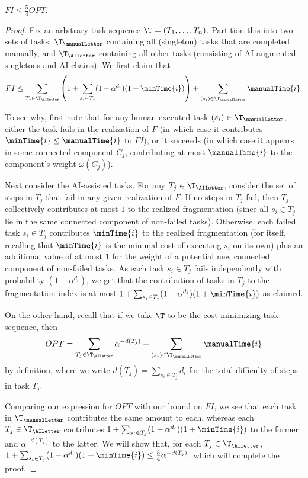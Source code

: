 \begin{lem}
\label{lem:FI.upper.bound}
    $FI \leq \tfrac{5}{4}OPT$.
\end{lem}
\begin{proof}
Fix an arbitrary task sequence $\T = (T_1, \dotsc, T_n)$.
Partition this into two sets of tasks: $\T_{\manualLetter}$ containing all (singleton) tasks that are completed manually, and $\T_{\AIletter}$ containing all other tasks (consisting of AI-augmented singletons and AI chains).
We first claim that
\[ FI \leq \sum_{T_j \in \T_{\AIletter}}\left(1 + \sum_{s_i \in T_j}(1-\alpha^{d_i})(1+\minTime{i})\right) + \sum_{(s_i) \in \T_{\manualLetter}}\manualTime{i}. \]

To see why, first note that for any human-executed task $(s_i) \in \T_{\manualLetter}$, either the task fails in the realization of $F$ (in which case it contributes $\minTime{i} \leq \manualTime{i}$ to $FI$), or it succeeds (in which case it appears in some connected component $C_j$, contributing at most $\manualTime{i}$ to the component's weight $\omega(C_j)$).

Next consider the AI-assisted tasks.
For any $T_j \in \T_{\AIletter}$, consider the set of steps in $T_j$ that fail in any given realization of $F$.
If no steps in $T_j$ fail, then $T_j$ collectively contributes at most $1$ to the realized fragmentation (since all $s_i \in T_j$ lie in the same connected component of non-failed tasks).
Otherwise, each failed task $s_i \in T_j$ contributes $\minTime{i}$ to the realized fragmentation (for itself, recalling that $\minTime{i}$ is the minimal cost of executing $s_i$ on its own) plus an additional value of at most $1$ for the weight of a potential new connected component of non-failed tasks.
As each task $s_i \in T_j$ fails independently with probability $(1-\alpha^{d_i})$, we get that the contribution of tasks in $T_j$ to the fragmentation index is at most $1 + \sum_{s_i \in T_j}(1-\alpha^{d_i})(1+\minTime{i})$ as claimed.

On the other hand, recall that if we take $\T$ to be the cost-minimizing task sequence, then
\[ OPT = \sum_{T_j \in \T_{\AIletter}} \alpha^{-d(T_j)} + \sum_{(s_i) \in \T_{\manualLetter}} \manualTime{i} \]
by definition, where we write $d(T_j) = \sum_{s_i \in T_j}d_i$ for the total difficulty of steps in task $T_j$.

Comparing our expression for $OPT$ with our bound on $FI$, we see that each task in $\T_{\manualLetter}$ contributes the same amount to each, whereas each $T_j \in \T_{\AIletter}$ contributes $1+\sum_{s_i \in T_j}(1-\alpha^{d_i})(1+\minTime{i})$ to the former and $\alpha^{-d(T_j)}$ to the latter.
We will show that, for each $T_j \in \T_{\AIletter}$, $1 + \sum_{s_i \in T_j}(1-\alpha^{d_i})(1+\minTime{i}) \leq \frac{5}{4} \alpha^{-d(T_j)}$, which will complete the proof.


\end{proof}
